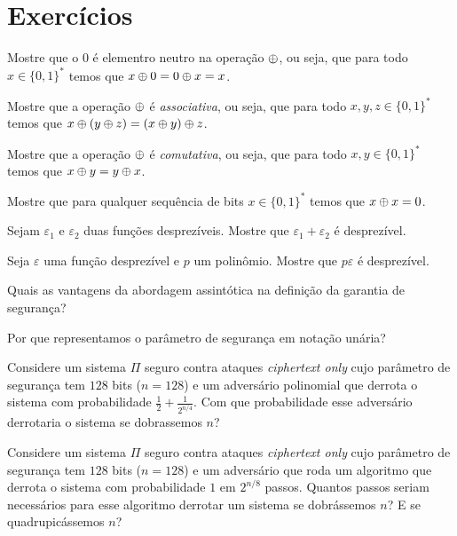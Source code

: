 \section{Exercícios}
\label{sec:exercicios}

\begin{exercicio}
  Mostre que o $0$ é elementro neutro na operação $\oplus$, ou seja, que para todo $x \in \{0,1\}^*$ temos que $x \oplus 0 = 0 \oplus x = x$.
\end{exercicio}

\begin{exercicio}
  Mostre que a operação $\oplus$ é {\em associativa}, ou seja, que para todo $x,y,z \in \{0,1\}^*$ temos que $x \oplus (y \oplus z) = (x \oplus y) \oplus z$.
\end{exercicio}

\begin{exercicio}
  Mostre que a operação $\oplus$ é {\em comutativa}, ou seja, que para todo $x,y \in \{0,1\}^*$ temos que $x \oplus y = y \oplus x$.
\end{exercicio}

\begin{exercicio}
  Mostre que para qualquer sequência de bits $x \in \{0,1\}^*$ temos que $x \oplus x = 0$.
\end{exercicio}

\begin{exercicio}
  Sejam $\varepsilon_1$ e $\varepsilon_2$ duas funções desprezíveis.
  Mostre que $\varepsilon_1 + \varepsilon_2$ é desprezível.
\end{exercicio}

\begin{exercicio}
  Seja $\varepsilon$ uma função desprezível e $p$ um polinômio.
  Mostre que $p\varepsilon$ é desprezível.
\end{exercicio}

\begin{exercicio}
  Quais as vantagens da abordagem assintótica na definição da garantia de segurança?
\end{exercicio}

\begin{exercicio}
  Por que representamos o parâmetro de segurança em notação unária?
\end{exercicio}

\begin{exercicio}
  Considere um sistema $\Pi$ seguro contra ataques {\em ciphertext only} cujo parâmetro de segurança tem $128$ bits ($n = 128$) e um adversário polinomial que derrota o sistema com probabilidade $\frac{1}{2} + \frac{1}{2^{n/4}}$.
Com que probabilidade esse adversário derrotaria o sistema se dobrassemos $n$?
\end{exercicio}

\begin{exercicio}
  Considere um sistema $\Pi$ seguro contra ataques {\em ciphertext only} cujo parâmetro de segurança tem $128$ bits ($n = 128$) e um adversário que roda um algoritmo que derrota o sistema com probabilidade $1$ em $2^{n/8}$ passos.
  Quantos passos seriam necessários para esse algoritmo derrotar um sistema se dobrássemos $n$? E se quadrupicássemos $n$?
\end{exercicio}

